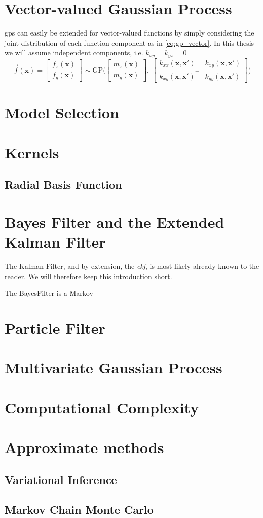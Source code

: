 \section{Vector-valued Gaussian Process}
\acrshort{gp}s can easily be extended for vector-valued functions by simply considering the joint distribution of each function component as in \cref{eq:gp_vector}. In this thesis we will assume independent components, i.e. $k_{xy}=k_{yx}=0$
\begin{equation}\label{eq:gp_vector}
     \vec{f}(\boldsymbol{x}) = \begin{bmatrix} f_x (\boldsymbol{x})\\ f_y (\boldsymbol{x})\end{bmatrix} \sim \text{GP} \big(\begin{bmatrix} m_x(\boldsymbol{x})\\m_y(\boldsymbol{x})\end{bmatrix}, \ \begin{bmatrix}
    k_{xx}(\boldsymbol{x}, \boldsymbol{x}') & k_{xy}(\boldsymbol{x}, \boldsymbol{x}') \\ k_{xy}(\boldsymbol{x}, \boldsymbol{x}')^\intercal & k_{yy}(\boldsymbol{x}, \boldsymbol{x}')
    \end{bmatrix}\big) 
\end{equation}

\section{Model Selection}
\section{Kernels}\label{sec:kernels}
\subsection{Radial Basis Function}\label{sec:kernels_rbf}

\section{Bayes Filter and the Extended Kalman Filter}
The Kalman Filter, and by extension, the \textit{\acrfull{ekf}}, is most likely already known to the reader. We will therefore keep this introduction short. 

The BayesFilter is a Markov 


\section{Particle Filter}
\section{Multivariate Gaussian Process}
\section{Computational Complexity}
\section{Approximate methods}
\subsection{Variational Inference}
\subsection{Markov Chain Monte Carlo}
